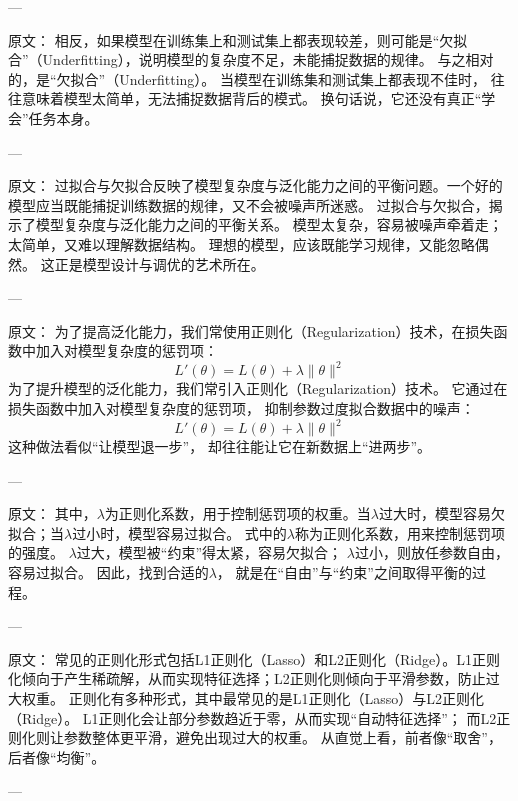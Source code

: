 ---

原文：
相反，如果模型在训练集上和测试集上都表现较差，则可能是“欠拟合”（Underfitting），说明模型的复杂度不足，未能捕捉数据的规律。
与之相对的，是“欠拟合”（Underfitting）。  
当模型在训练集和测试集上都表现不佳时，  
往往意味着模型太简单，无法捕捉数据背后的模式。  
换句话说，它还没有真正“学会”任务本身。

---

原文：
过拟合与欠拟合反映了模型复杂度与泛化能力之间的平衡问题。一个好的模型应当既能捕捉训练数据的规律，又不会被噪声所迷惑。
过拟合与欠拟合，揭示了模型复杂度与泛化能力之间的平衡关系。  
模型太复杂，容易被噪声牵着走；太简单，又难以理解数据结构。  
理想的模型，应该既能学习规律，又能忽略偶然。  
这正是模型设计与调优的艺术所在。

---

原文：
为了提高泛化能力，我们常使用正则化（Regularization）技术，在损失函数中加入对模型复杂度的惩罚项：
$$
L'(\theta) = L(\theta) + \lambda \|\theta\|^2
$$
为了提升模型的泛化能力，我们常引入正则化（Regularization）技术。  
它通过在损失函数中加入对模型复杂度的惩罚项，  
抑制参数过度拟合数据中的噪声：
$$
L'(\theta) = L(\theta) + \lambda \|\theta\|^2
$$  
这种做法看似“让模型退一步”，  
却往往能让它在新数据上“进两步”。

---

原文：
其中，$\lambda$为正则化系数，用于控制惩罚项的权重。当$\lambda$过大时，模型容易欠拟合；当$\lambda$过小时，模型容易过拟合。
式中的$\lambda$称为正则化系数，用来控制惩罚项的强度。  
$\lambda$过大，模型被“约束”得太紧，容易欠拟合；  
$\lambda$过小，则放任参数自由，容易过拟合。  
因此，找到合适的$\lambda$，  
就是在“自由”与“约束”之间取得平衡的过程。

---

原文：
常见的正则化形式包括L1正则化（Lasso）和L2正则化（Ridge）。L1正则化倾向于产生稀疏解，从而实现特征选择；L2正则化则倾向于平滑参数，防止过大权重。
正则化有多种形式，其中最常见的是L1正则化（Lasso）与L2正则化（Ridge）。  
L1正则化会让部分参数趋近于零，从而实现“自动特征选择”；  
而L2正则化则让参数整体更平滑，避免出现过大的权重。  
从直觉上看，前者像“取舍”，后者像“均衡”。

---

